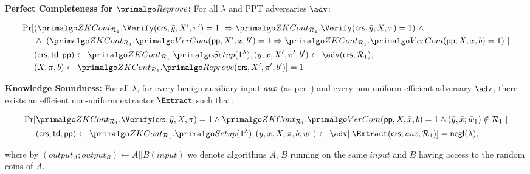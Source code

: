 \begin{definition}[ZK Continuation]
\begin{footnotesize}
\end{footnotesize}

\noindent \textbf{Perfect Completeness for $\Reprove$:} For all $\lambda$ and PPT adversaries $\adv$: 
\begin{footnotesize}
\begin{align*}
\Pr [& (\ZKCont_{\relone}.\Verify(\crs, \bar{y}, X', \pi') = 1 \  \Rightarrow \ZKCont_{\relone}.\Verify(\crs, \bar{y}, X, \pi) = 1)  \ \wedge \ \\
                   &\wedge \ (\ZKCont_{\relone}.\VerifyCom (\pp, X', \barx, b') = 1  \Rightarrow  \ZKCont_{\relone}.\VerifyCom (\pp, X, \barx, b) = 1) \ | \\
                   & (\crs, \tw, \pp) \leftarrow \ZKCont_{\relone}.\Setup (1^{\lambda}),  (\bary, \barx, X', \pi', b') \leftarrow \adv(\crs,\relone), \\
                   & (X, \pi, b) \leftarrow \ZKCont_{\relone}.\Reprove(\crs, X', \pi', b')] = 1
\end{align*}
\end{footnotesize}

\noindent \textbf{Knowledge Soundness:} For all $\lambda$, for every benign auxiliary input $\mathit{aux}$ (as per~\cite{bening_auxiliary}) and 
every non-uniform efficient adversary $\adv$, there exists an efficient non-uniform extractor  $ \Extract $ such that:
\begin{footnotesize}
\begin{align*}
\Pr [& \ZKCont_{\relone}.\Verify(\crs, \bar{y}, X, \pi) = 1  \wedge \ZKCont_{\relone}.\VerifyCom(\pp, X, \bar{x}, b) = 1  \wedge (\bary, \barx; \baromega_1) \notin \relone\ | \\
                   & (\crs, \tw, \pp) \leftarrow \ZKCont_{\relone}.\Setup (1^{\lambda}), (\bary, \barx, X, \pi, b; \baromega_1 ) \leftarrow \adv || \Extract(\crs, \realaux, \relone)] = \negl (\lambda),
\end{align*}
\end{footnotesize}

\noindent where by $(\mathit{output_{A}};\mathit{output_{B}}) \leftarrow A || B(\mathit{input})$ we denote algorithms $A$, $B$ running on the same 
$\mathit{input}$ and $B$ having access to the random coins of $A$. \\


\end{definition}
